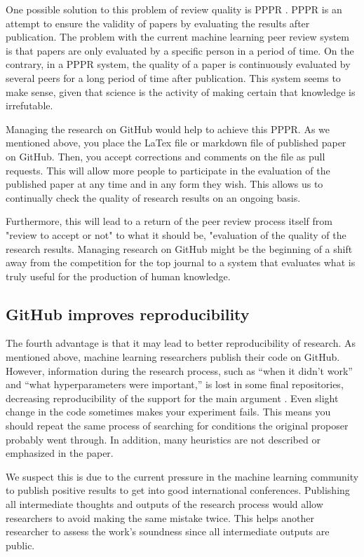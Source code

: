 \documentclass{article}
\begin{document}
One possible solution to this problem of review quality is PPPR \cite{knoepfler2015reviewing}. PPPR is an attempt to ensure the validity of papers by evaluating the results after publication. The problem with the current machine learning peer review system is that papers are only evaluated by a specific person in a period of time. On the contrary, in a PPPR system, the quality of a paper is continuously evaluated by several peers for a long period of time after publication. This system seems to make sense, given that science is the activity of making certain that knowledge is irrefutable.

Managing the research on GitHub would help to achieve this PPPR. As we mentioned above, you place the LaTex file or markdown file of published paper on GitHub. Then, you accept corrections and comments on the file as pull requests. This will allow more people to participate in the evaluation of the published paper at any time and in any form they wish. This allows us to continually check the quality of research results on an ongoing basis.

Furthermore, this will lead to a return of the peer review process itself from "review to accept or not" to what it should be, "evaluation of the quality of the research results. Managing research on GitHub might be the beginning of a shift away from the competition for the top journal to a system that evaluates what is truly useful for the production of human knowledge.

\subsection{GitHub improves reproducibility}
The fourth advantage is that it may lead to better reproducibility of research. As mentioned above, machine learning researchers publish their code on GitHub. However, information during the research process, such as ``when it didn't work'' and ``what hyperparameters were important,'' is lost in some final repositories, decreasing reproducibility of the support for the main argument \cite{raff2019step}. Even slight change in the code sometimes makes your experiment fails. This means you should repeat the same process of searching for conditions the original proposer probably went through. In addition, many heuristics are not described or emphasized in the paper. 

We suspect this is due to the current pressure in the machine learning community to publish positive results to get into good international conferences. Publishing all intermediate thoughts and outputs of the research process would allow researchers to avoid making the same mistake twice. This helps another researcher to assess the work's soundness since all intermediate outputs are public.
\end{document}
